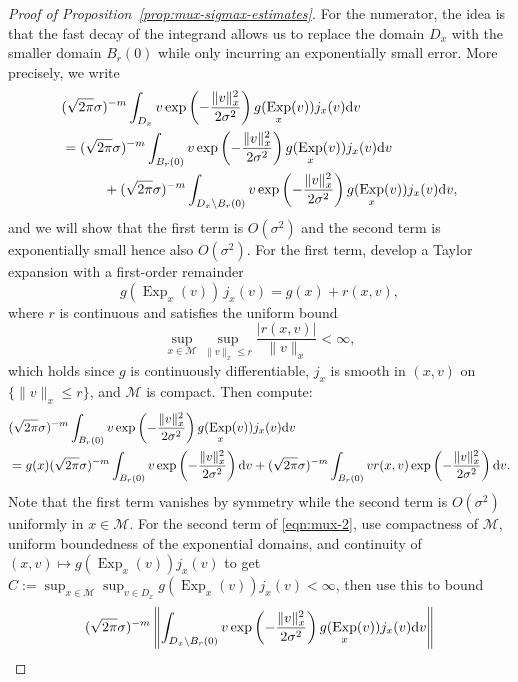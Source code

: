 \documentclass[preprint]{imsart}
\theoremstyle{plain}
\theoremstyle{definition}
\newcommand{\Mcal}{\mathcal{M}}
\newcommand{\diff}{\textnormal{d}}
\DeclareMathOperator{\Exp}{Exp}
\begin{document}
\begin{appendix}
\begin{proof}[Proof of Proposition~\ref{prop:mux-sigmax-estimates}]
    For the numerator, the idea is that the fast decay of the integrand allows us to replace the domain $D_x$ with the smaller domain $B_r(0)$ while only incurring an exponentially small error.
    More precisely, we write
    \begin{equation}\label{eqn:mux-2}
        \begin{split}
        &(\sqrt{2\pi}\sigma)^{-m}\int_{D_x}v \exp\left(-\frac{\|v\|_x^2}{2\sigma^2}\right)g(\Exp_x(v))j_x(v)\diff v \\
        &= (\sqrt{2\pi}\sigma)^{-m}\int_{B_r(0)}v \exp\left(-\frac{\|v\|_x^2}{2\sigma^2}\right)g(\Exp_x(v))j_x(v)\diff v \\
        &\qquad \quad + (\sqrt{2\pi}\sigma)^{-m}\int_{D_x\setminus B_r(0)}v \exp\left(-\frac{\|v\|_x^2}{2\sigma^2}\right)g(\Exp_x(v))j_x(v)\diff v,
        \end{split}
    \end{equation}
    and we will show that the first term is $O(\sigma^2)$ and the second term is exponentially small hence also $O(\sigma^2)$.
    For the first term, develop a Taylor expansion with a first-order remainder
\[
g(\Exp_x(v))\,j_x(v)=g(x)+r(x,v),
\]
where $r$ is continuous and satisfies the uniform bound
\[
\sup_{x\in\Mcal}\sup_{\|v\|_x\le r}\frac{|r(x,v)|}{\|v\|_x}<\infty,
\]
which holds since $g$ is continuously differentiable, $j_x$ is smooth in $(x,v)$ on $\{\|v\|_x\le r\}$, and $\Mcal$ is compact.
    Then compute:
    \begin{align*}
        &(\sqrt{2\pi}\sigma)^{-m}\int_{B_r(0)}v \exp\left(-\frac{\|v\|_x^2}{2\sigma^2}\right)g(\Exp_x(v))j_x(v)\diff v \\
        &= g(x)(\sqrt{2\pi}\sigma)^{-m}\int_{B_r(0)}v \exp\left(-\frac{\|v\|_x^2}{2\sigma^2}\right)\diff v + (\sqrt{2\pi}\sigma)^{-m}\int_{B_r(0)} v r(x,v)\exp\left(-\frac{\|v\|_x^2}{2\sigma^2}\right)\diff v.
    \end{align*}
Note that the first term vanishes by symmetry while the second term is $O(\sigma^{2})$ uniformly in $x\in\Mcal$.
    For the second term of \eqref{eqn:mux-2}, use compactness of $\Mcal$, uniform boundedness of the exponential domains, and continuity of $(x,v)\mapsto g(\Exp_x(v))j_x(v)$ to get $C:=\sup_{x\in\Mcal}\sup_{v\in D_x}g(\Exp_x(v))j_x(v)<\infty$, then use this to bound
    \begin{equation}
        \begin{split}
            &(\sqrt{2\pi}\sigma)^{-m}\left\|\int_{D_x\setminus B_r(0)}v \exp\left(-\frac{\|v\|_x^2}{2\sigma^2}\right)g(\Exp_x(v))j_x(v)\diff v\right\| \\

\end{split}
\end{equation}
\end{proof}
\end{appendix}
\end{document}
